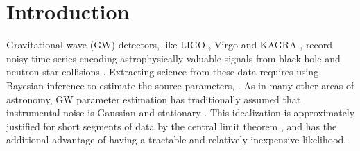 \documentclass[twocolumn]{aastex631}
\begin{document}

\section{Introduction} \label{sec:intro}

Gravitational-wave (GW) detectors, like LIGO \citep{LIGOScientific:2014pky}, Virgo \citep{VIRGO:2014yos} and KAGRA \citep{Aso:2013eba}, record noisy time series encoding astrophysically-valuable signals from black hole and neutron star collisions \citep{LIGOScientific:2016aoc,LIGOScientific:2017vwq,LIGOScientific:2021djp}. Extracting science from these data requires using Bayesian inference to estimate the source parameters,  \citep[e.g., black hole masses and spins, ][]{Veitch:2014wba,Ashton:2018jfp,Romero-Shaw:2020owr,Biwer:2018osg,Wong:2023lgb}. As in many other areas of astronomy, GW parameter estimation has traditionally assumed that instrumental noise is Gaussian and stationary \citep{LIGOScientific:2019hgc}. This idealization is approximately justified for short segments of data by the central limit theorem \citep{Berry:2014jja}, and has the additional advantage of having a tractable and relatively inexpensive likelihood.
\end{document}
